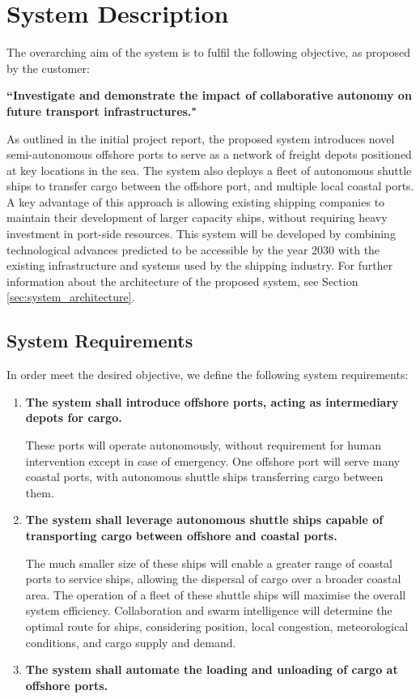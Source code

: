 \section{System Description}

\noindent The overarching aim of the system is to fulfil the following objective, as proposed by the customer:

\noindent\textbf{``Investigate and demonstrate the impact of collaborative autonomy on future transport infrastructures."}

As outlined in the initial project report, the proposed system introduces novel semi-autonomous offshore ports to serve as a network of freight depots positioned at key locations in the sea. The system also deploys a fleet of autonomous shuttle ships to transfer cargo between the offshore port, and multiple local coastal ports. A key advantage of this approach is allowing existing shipping companies to maintain their development of larger capacity ships, without requiring heavy investment in port-side resources. This system will be developed by combining technological advances predicted to be accessible by the year 2030 with the existing infrastructure and systems used by the shipping industry. For further information about the architecture of the proposed system, see Section \ref{sec:system_architecture}.

\subsection{System Requirements}

\noindent In order meet the desired objective, we define the following system requirements:

\begin{enumerate}[label={\textbf{(\arabic*)}}, itemsep=1pt, topsep=1pt]
	\item \textbf{The system shall introduce offshore ports, acting as intermediary depots for cargo.}

		These ports will operate autonomously, without requirement for human intervention except in case of emergency. One offshore port will serve many coastal ports, with autonomous shuttle ships transferring cargo between them. 

	\item \textbf{The system shall leverage autonomous shuttle ships capable of transporting cargo between offshore and coastal ports.}

		The much smaller size of these ships will enable a greater range of coastal ports to service ships, allowing the dispersal of cargo over a broader coastal area. The operation of a fleet of these shuttle ships will maximise the overall system efficiency. Collaboration and swarm intelligence will determine the optimal route for ships, considering position, local congestion, meteorological conditions, and cargo supply and demand.

	\item \textbf{The system shall automate the loading and unloading of cargo at offshore ports.}
\end{enumerate}

